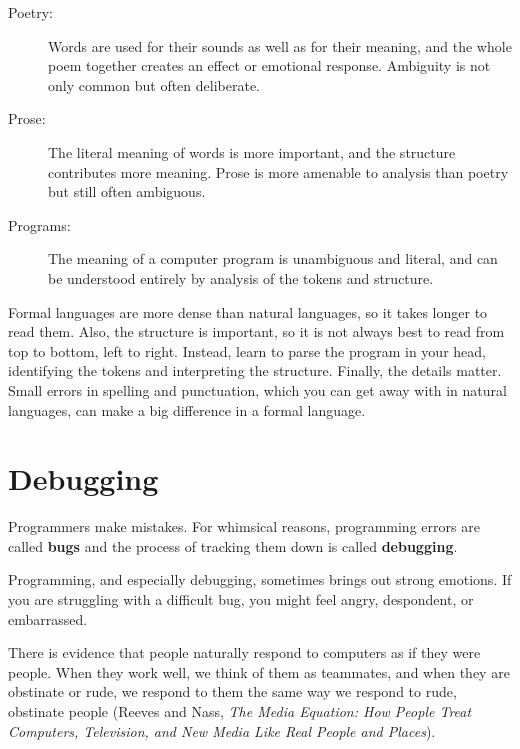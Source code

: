 \documentclass[10pt]{book}
\begin{document}
\begin{description}

\item[Poetry:] Words are used for their sounds as well as for
their meaning, and the whole poem together creates an effect or
emotional response.  Ambiguity is not only common but often
deliberate.

\item[Prose:] The literal meaning of words is more important,
and the structure contributes more meaning.  Prose is more amenable to
analysis than poetry but still often ambiguous.

\item[Programs:] The meaning of a computer program is unambiguous
and literal, and can be understood entirely by analysis of the
tokens and structure.

\end{description}

Formal languages are more dense
than natural languages, so it takes longer to read them.  Also, the
structure is important, so it is not always best to read
from top to bottom, left to right.  Instead, learn to parse the
program in your head, identifying the tokens and interpreting the
structure.  Finally, the details matter.  Small errors in
spelling and punctuation, which you can get away
with in natural languages, can make a big difference in a formal
language.


\section{Debugging}

Programmers make mistakes.  For whimsical reasons, programming errors
are called {\bf bugs} and the process of tracking them down is called
{\bf debugging}.

Programming, and especially debugging, sometimes brings out strong
emotions.  If you are struggling with a difficult bug, you might 
feel angry, despondent, or embarrassed.

There is evidence that people naturally respond to computers as if
they were people.  When they work well, we think
of them as teammates, and when they are obstinate or rude, we
respond to them the same way we respond to rude,
obstinate people (Reeves and Nass, {\it The Media
    Equation: How People Treat Computers, Television, and New Media
    Like Real People and Places}).
\end{document}
